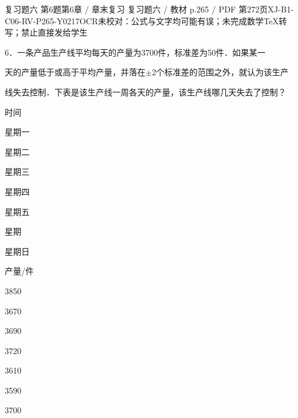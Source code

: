 \begin{bankitem}{复习题六 第6题}{第6章 / 章末复习 复习题六 / 教材 p.265 / PDF 第272页}{XJ-B1-C06-RV-P265-Y0217}{OCR未校对：公式与文字均可能有误；未完成数学TeX转写；禁止直接发给学生}
\begin{ocrdraft}
\par
6．一条产品生产线平均每天的产量为3700件，标准差为50件．如果某一
\par
天的产量低于或高于平均产量，并落在\ensuremath{\pm}2个标准差的范围之外，就认为该生产
\par
线失去控制．下表是该生产线一周各天的产量，该生产线哪几天失去了控制？
\par
时间
\par
星期一
\par
星期二
\par
星期三
\par
星期四
\par
星期五
\par
星期
\par
星期日
\par
产量/件
\par
3850
\par
3670
\par
3690
\par
3720
\par
3610
\par
3590
\par
3700
\end{ocrdraft}
\end{bankitem}
